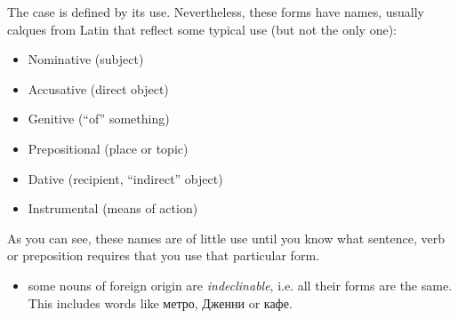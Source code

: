 The case is defined by its use. Nevertheless, these forms have names,
usually calques from Latin that reflect some typical use (but not the
only one):

\begin{itemize}
\tightlist
\item
  Nominative (subject)
\item
  Accusative (direct object)
\item
  Genitive (``of'' something)
\item
  Prepositional (place or topic)
\item
  Dative (recipient, ``indirect'' object)
\item
  Instrumental (means of action)
\end{itemize}

As you can see, these names are of little use until you know what
sentence, verb or preposition requires that you use that particular
form.

\begin{itemize}
\tightlist
\item
  some nouns of foreign origin are \emph{indeclinable}, i.e. all their
  forms are the same. This includes words like метро, Дженни or кафе.
\end{itemize}
